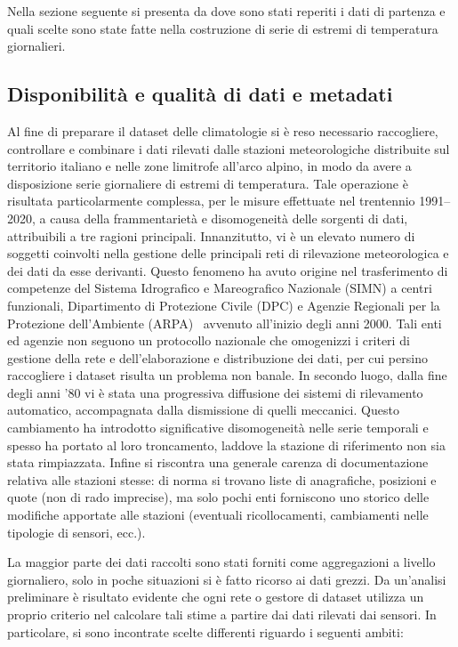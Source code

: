 
Nella sezione seguente si presenta da dove sono stati reperiti i dati di partenza e quali scelte sono state fatte nella costruzione di serie di estremi di temperatura giornalieri.

\subsection{Disponibilità e qualità di dati e metadati}
Al fine di preparare il dataset delle climatologie si è reso necessario raccogliere, controllare e combinare i dati rilevati dalle stazioni meteorologiche distribuite sul territorio italiano e nelle zone limitrofe all'arco alpino, in modo da avere a disposizione serie giornaliere di estremi di temperatura. Tale operazione è risultata particolarmente complessa, per le misure effettuate nel trentennio 1991--2020, a causa della frammentarietà e disomogeneità delle sorgenti di dati, attribuibili a tre ragioni principali. Innanzitutto, vi è un elevato numero di soggetti coinvolti nella gestione delle principali reti di rilevazione meteorologica e dei dati da esse derivanti. Questo fenomeno ha avuto origine nel trasferimento di competenze del Sistema Idrografico e Mareografico Nazionale (SIMN) a centri funzionali, Dipartimento di Protezione Civile (DPC) e Agenzie Regionali per la Protezione dell'Ambiente (ARPA)~\cite{InquadramentoStoricoMonitoraggio} avvenuto all'inizio degli anni 2000. Tali enti ed agenzie non seguono un protocollo nazionale che omogenizzi i criteri di gestione della rete e dell'elaborazione e distribuzione dei dati, per cui persino raccogliere i dataset risulta un problema non banale. In secondo luogo, dalla fine degli anni '80 vi è stata una progressiva diffusione dei sistemi di rilevamento automatico, accompagnata dalla dismissione di quelli meccanici. Questo cambiamento ha introdotto significative disomogeneità nelle serie temporali e spesso ha portato al loro troncamento, laddove la stazione di riferimento non sia stata rimpiazzata. Infine si riscontra una generale carenza di documentazione relativa alle stazioni stesse: di norma si trovano liste di anagrafiche, posizioni e quote (non di rado imprecise), ma solo pochi enti forniscono uno storico delle modifiche apportate alle stazioni (eventuali ricollocamenti, cambiamenti nelle tipologie di sensori, ecc.).

La maggior parte dei dati raccolti sono stati forniti come aggregazioni a livello giornaliero, solo in poche situazioni si è fatto ricorso ai dati grezzi. Da un'analisi preliminare è risultato evidente che ogni rete o gestore di dataset utilizza un proprio criterio nel calcolare tali stime a partire dai dati rilevati dai sensori. In particolare, si sono incontrate scelte differenti riguardo i seguenti ambiti:

